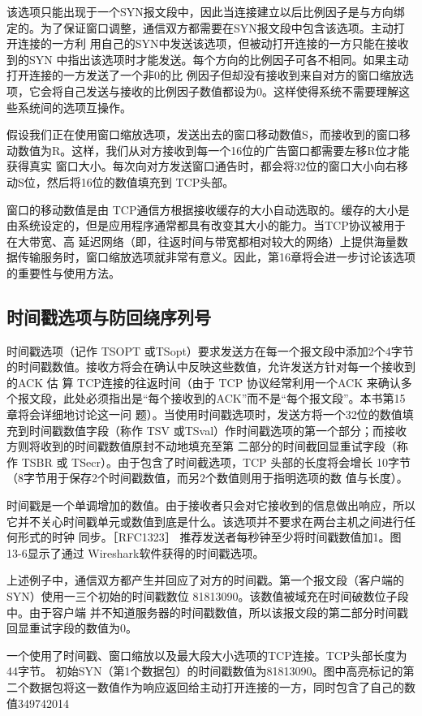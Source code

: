 该选项只能出现于一个SYN报文段中，因此当连接建立以后比例因子是与方向绑定的。为了保证窗口调整，通信双方都需要在SYN报文段中包含该选项。主动打开连接的一方利
用自己的SYN中发送该选项，但被动打开连接的一方只能在接收到的SYN 中指出该选项时才能发送。每个方向的比例因子可各不相同。如果主动打开连接的一方发送了一个非0的比
例因子但却没有接收到来自对方的窗口缩放选项，它会将自己发送与接收的比例因子数值都设为0。这样使得系统不需要理解这些系统间的选项互操作。

假设我们正在使用窗口缩放选项，发送出去的窗口移动数值S，而接收到的窗口移动数值为R。这样，我们从对方接收到每一个16位的广告窗口都需要左移R位才能获得真实
窗口大小。每次向对方发送窗口通告时，都会将32位的窗口大小向右移动S位，然后将16位的数值填充到 TCP头部。

窗口的移动数值是由 TCP通信方根据接收缓存的大小自动选取的。缓存的大小是由系统设定的，但是应用程序通常都具有改变其大小的能力。当TCP协议被用于在大带宽、高
延迟网络（即，往返时间与带宽都相对较大的网络）上提供海量数据传输服务时，窗口缩放选项就非常有意义。因此，第16章将会进一步讨论该选项的重要性与使用方法。

\subsection{时间戳选项与防回绕序列号}
时间戳选项（记作 TSOPT 或TSopt）要求发送方在每一个报文段中添加2个4字节的时间戳数值。接收方将会在确认中反映这些数值，允许发送方针对每一个接收到的ACK 估
算 TCP连接的往返时间（由于 TCP 协议经常利用一个ACK 来确认多个报文段，此处必须指出是“每个接收到的ACK”而不是“每个报文段”。本书第15 章将会详细地讨论这一问
题）。当使用时间戳选项时，发送方将一个32位的数值填充到时间戳数值字段（称作 TSV 或TSval）作时间戳选项的第一个部分；而接收方则将收到的时间戳数值原封不动地填充至第
二部分的时间截回显重试字段（称作 TSBR 或 TSecr）。由于包含了时间截选项，TCP 头部的长度将会增长 10字节（8字节用于保存2个时间戳数值，而另2个数值则用于指明选项的数
值与长度）。

时间戳是一个单调增加的数值。由于接收者只会对它接收到的信息做出响应，所以它并不关心时间戳单元或数值到底是什么。该选项并不要求在两台主机之间进行任何形式的时钟
同步。［RFC1323］ 推荐发送者每秒钟至少将时间戳数值加1。图13-6显示了通过 Wireshark软件获得的时间戳选项。

上述例子中，通信双方都产生并回应了对方的时间戳。第一个报文段（客户端的SYN）使用一三个初始的时间戳数位 81813090。该数值被域充在时间破数位子段中。由于容户端
并不知道服务器的时间戳数值，所以该报文段的第二部分时间戳回显重试字段的数值为0。

一个使用了时间戳、窗口缩放以及最大段大小选项的TCP连接。TCP头部长度为44字节。
初始SYN（第1个数据包）的时间戳数值为81813090。图中高亮标记的第二个数据包将这一数值作为响应返回给主动打开连接的一方，同时包含了自己的数值349742014

